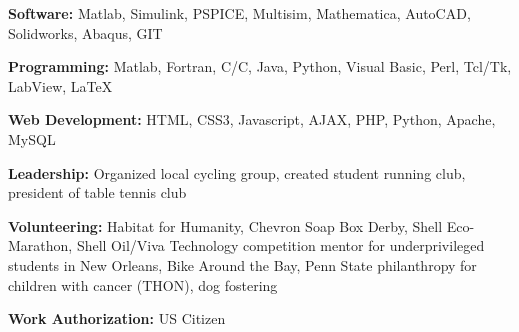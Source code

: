 \documentclass[11pt]{extarticle}
\newcommand{\CC}{C\nolinebreak\hspace{-.05em}\raisebox{.1ex}{\small\bf +}\nolinebreak\hspace{-.10em}\raisebox{.1ex}{\small\bf +}}
\begin{document}
\begin{description}[itemsep=-3pt,leftmargin=30.5pt,itemindent=-2em]
\item[] \textbf{Software:} Matlab, Simulink, PSPICE, Multisim, Mathematica, AutoCAD, Solidworks, Abaqus, GIT%
\item[] \textbf{Programming:} Matlab, Fortran, C/\CC, Java, Python, Visual Basic, Perl, Tcl/Tk, LabView, LaTeX
\item[] \textbf{Web Development:} HTML, CSS3, Javascript, AJAX, PHP, Python, Apache, MySQL
\item[] \textbf{Leadership:} Organized local cycling group, created student running club, president of table tennis club
\item[] \textbf{Volunteering:} Habitat for Humanity, Chevron Soap Box Derby, Shell Eco-Marathon, Shell Oil/Viva Technology competition mentor for underprivileged students in New Orleans, Bike Around the Bay, Penn State philanthropy for children with cancer (THON), dog fostering
\item[] \textbf{Work Authorization:} {US Citizen}
\end{description}
\end{document}
